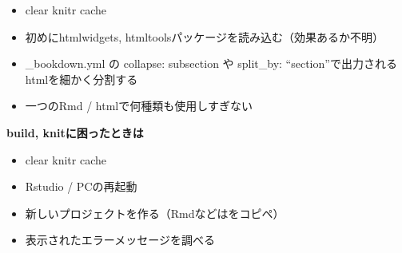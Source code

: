\documentclass[
]{book}
\providecommand{\tightlist}{%
  \setlength{\itemsep}{0pt}\setlength{\parskip}{0pt}}
\begin{document}
\begin{itemize}
\tightlist
\item
  clear knitr cache
\item
  初めにhtmlwidgets, htmltoolsパッケージを読み込む（効果あるか不明）
\item
  \_bookdown.yml の collapse: subsection や split\_by: ``section''で出力されるhtmlを細かく分割する
\item
  一つのRmd / htmlで何種類も使用しすぎない
\end{itemize}

\textbf{build, knitに困ったときは}

\begin{itemize}
\tightlist
\item
  clear knitr cache
\item
  Rstudio / PCの再起動
\item
  新しいプロジェクトを作る（Rmdなどはをコピペ）
\item
  表示されたエラーメッセージを調べる
\end{itemize}

  
\end{document}
